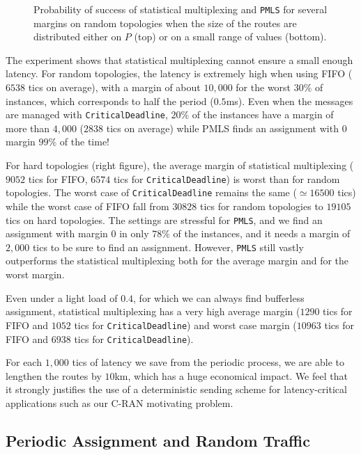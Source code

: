\documentclass[a4paper,10pt]{journal}
\newcommand\PMLS{\texttt{PMLS}\xspace}
\newcommand\critdead{\texttt{CriticalDeadline}\xspace}
\begin{document}
\begin{figure}
\begin{center}
       \end{center}
      
      
  \caption{Probability of success of statistical multiplexing and \PMLS for several margins on random topologies when the size of the routes are distributed either on $P$ (top) or on a small range of values (bottom).}
      \label{fig:sto} 
      \end{figure}

   The experiment shows that statistical multiplexing cannot ensure a small enough latency. 
    For random topologies, the latency is extremely high when using FIFO ($6538$ tics on average), with a margin of about $10,000$ for the worst $30\%$ of instances, which corresponds to half the period ($0.5$ms). Even when the messages are managed with \critdead, $20\%$ of the instances have a margin of more than $4,000$ ($2838$ tics on average) while PMLS finds an assignment with $0$ margin $99\%$ of the time! 
    
    For hard topologies (right figure), the average margin of statistical multiplexing ($9052$ tics for FIFO, $6574$ tics for \critdead) is worst than for random topologies. The worst case of \critdead  remains the same ($\simeq 16500$ tics) while the worst case of FIFO fall from $30828$ tics for random topologies to $19105$ tics on hard topologies. The settings are stressful for \PMLS, and we find an assignment with margin $0$ in only $78\%$ of the instances, and it needs a margin of $2,000$ tics to be sure to find an assignment. However, \PMLS still vastly outperforms the statistical multiplexing both for the average margin and for the worst margin. 
    
    Even under a light load of $0.4$, for which we can always find bufferless assignment, statistical multiplexing has a very high average margin ($1290$ tics for FIFO and $1052$ tics for \critdead) and worst case margin ($10963$ tics for FIFO and $6938$ tics for \critdead).

    For each $1,000$ tics of latency we save from the periodic process, we are able to lengthen the routes by $10$km, which has a huge economical impact. We feel that it strongly justifies the use of a deterministic sending scheme for latency-critical applications such as our C-RAN motivating problem.    
     
    \subsection{Periodic Assignment and Random Traffic}
    
\end{document}
